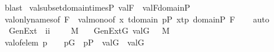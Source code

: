 \begin{isabellebody}
\ blast%
\endisatagproof
{\isafoldproof}%
%
\isadelimproof
\isanewline
%
\endisadelimproof
\isanewline
{}\isamarkupfalse%
\ val{\isacharunderscore}{\kern0pt}subset{\isacharunderscore}{\kern0pt}domain{\isacharunderscore}{\kern0pt}times{\isacharunderscore}{\kern0pt}P{\isacharcolon}{\kern0pt}\ {\isachardoublequoteopen}val{\isacharparenleft}{\kern0pt}F{\isacharcomma}{\kern0pt}{\isasymtau}{\isacharparenright}{\kern0pt}\ {\isasymsubseteq}\ val{\isacharparenleft}{\kern0pt}F{\isacharcomma}{\kern0pt}domain{\isacharparenleft}{\kern0pt}{\isasymtau}{\isacharparenright}{\kern0pt}{\isasymtimes}P{\isacharparenright}{\kern0pt}{\isachardoublequoteclose}\isanewline
%
\isadelimproof
\ \ %
\endisadelimproof
%
\isatagproof
{}\isamarkupfalse%
\ val{\isacharunderscore}{\kern0pt}only{\isacharunderscore}{\kern0pt}names{\isacharbrackleft}{\kern0pt}of\ F\ {\isasymtau}{\isacharbrackright}{\kern0pt}\ val{\isacharunderscore}{\kern0pt}mono{\isacharbrackleft}{\kern0pt}of\ {\isachardoublequoteopen}{\isacharbraceleft}{\kern0pt}x{\isasymin}{\isasymtau}{\isachardot}{\kern0pt}\ {\isasymexists}t{\isasymin}domain{\isacharparenleft}{\kern0pt}{\isasymtau}{\isacharparenright}{\kern0pt}{\isachardot}{\kern0pt}\ {\isasymexists}p{\isasymin}P{\isachardot}{\kern0pt}\ x{\isacharequal}{\kern0pt}{\isasymlangle}t{\isacharcomma}{\kern0pt}p{\isasymrangle}{\isacharbraceright}{\kern0pt}{\isachardoublequoteclose}\ {\isachardoublequoteopen}domain{\isacharparenleft}{\kern0pt}{\isasymtau}{\isacharparenright}{\kern0pt}{\isasymtimes}P{\isachardoublequoteclose}\ F{\isacharbrackright}{\kern0pt}\isanewline
\ \ \isamarkupfalse%
\ auto%
\endisatagproof
{\isafoldproof}%
%
\isadelimproof
\isanewline
%
\endisadelimproof
\isanewline
{}\isamarkupfalse%
\isanewline
\ \ GenExt\ {\isacharcolon}{\kern0pt}{\isacharcolon}{\kern0pt}\ {\isachardoublequoteopen}i{\isasymRightarrow}i{\isachardoublequoteclose}\ \ \ \ \ {\isacharparenleft}{\kern0pt}{\isachardoublequoteopen}M{\isacharbrackleft}{\kern0pt}{\isacharunderscore}{\kern0pt}{\isacharbrackright}{\kern0pt}{\isachardoublequoteclose}{\isacharparenright}{\kern0pt}\isanewline
\ \ \ {\isachardoublequoteopen}GenExt{\isacharparenleft}{\kern0pt}G{\isacharparenright}{\kern0pt}{\isasymequiv}\ {\isacharbraceleft}{\kern0pt}val{\isacharparenleft}{\kern0pt}G{\isacharcomma}{\kern0pt}{\isasymtau}{\isacharparenright}{\kern0pt}{\isachardot}{\kern0pt}\ {\isasymtau}\ {\isasymin}\ M{\isacharbraceright}{\kern0pt}{\isachardoublequoteclose}\isanewline
\isanewline
\isanewline
{}\isamarkupfalse%
\ val{\isacharunderscore}{\kern0pt}of{\isacharunderscore}{\kern0pt}elem{\isacharcolon}{\kern0pt}\ {\isachardoublequoteopen}{\isasymlangle}{\isasymtheta}{\isacharcomma}{\kern0pt}p{\isasymrangle}\ {\isasymin}\ {\isasympi}\ {\isasymLongrightarrow}\ p{\isasymin}G\ {\isasymLongrightarrow}\ p{\isasymin}P\ {\isasymLongrightarrow}\ val{\isacharparenleft}{\kern0pt}G{\isacharcomma}{\kern0pt}{\isasymtheta}{\isacharparenright}{\kern0pt}\ {\isasymin}\ val{\isacharparenleft}{\kern0pt}G{\isacharcomma}{\kern0pt}{\isasympi}{\isacharparenright}{\kern0pt}{\isachardoublequoteclose}\isanewline

\end{isabellebody}
